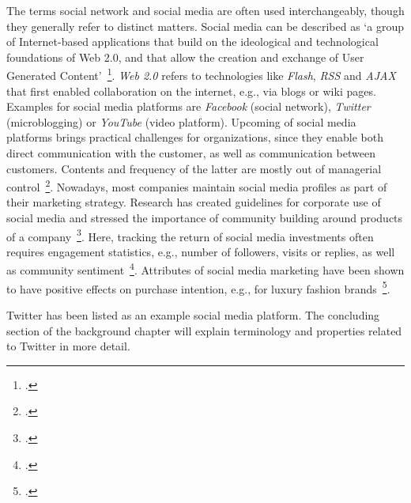 The terms social network and social media are often used interchangeably, though
they generally refer to distinct matters.
Social media can be described as `a group of Internet-based applications that
build on the ideological and technological foundations of Web 2.0, and that allow
the creation and exchange of User Generated Content'~\footcite[61]{Kaplan2010}.
\textit{Web 2.0} refers to technologies like \textit{Flash}, \textit{RSS} and 
\textit{AJAX} that first enabled collaboration on the internet, e.g., via blogs
or wiki pages.
Examples for social media platforms are \textit{Facebook} (social network), 
\textit{Twitter} (microblogging) or \textit{YouTube} (video platform).
Upcoming of social media platforms brings practical challenges for organizations,
since they enable both direct communication with the customer, as well as
communication between customers.
Contents and frequency of the latter are mostly out of managerial control~\footcite{Mangold2009}.
Nowadays, most companies maintain social media profiles as part of their
marketing strategy.
Research has created guidelines for corporate use of social media and stressed the
importance of community building around products of a company~\footcite{Culnan2010}.
Here, tracking the return of social media investments often requires engagement
statistics, e.g., number of followers, visits or replies, as well as community
sentiment~\footcite{Hoffman2010}.
Attributes of social media marketing have been shown to have positive effects
on purchase intention, e.g., for luxury fashion brands~\footcite{Kim2012}.

Twitter has been listed as an example social media platform.
The concluding section of the background chapter will explain terminology
and properties related to Twitter in more detail.
